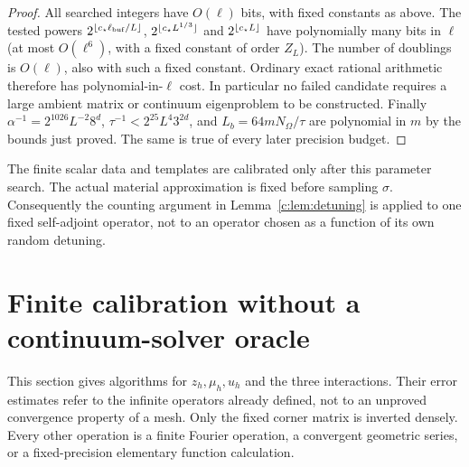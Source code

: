 \begin{proof}
All searched integers have $O(\ell)$ bits, with fixed constants as
above. The tested powers $2^{\lfloor c_\star \ell_{\rm buf}/L\rfloor}$,
$2^{\lfloor c_\star L^{1/3}\rfloor}$ and $2^{\lfloor c_\star L\rfloor}$ have
polynomially many bits in $\ell$ (at most $O(\ell^6)$, with a fixed
constant of order $Z_L$). The number of doublings is $O(\ell)$, also with such a
fixed constant. Ordinary exact rational arithmetic therefore has
polynomial-in-$\ell$ cost. In particular no failed candidate requires
a large ambient matrix or continuum eigenproblem to be constructed.
Finally $\alpha^{-1}=2^{1026}L^{-2}8^d$,
$\tau^{-1}<2^{25}L^4 3^{2d}$, and
$L_b=64mN_\Omega/\tau$ are polynomial in $m$ by the bounds just proved.
The same is true of every later precision budget.
\end{proof}

The finite scalar data and templates are calibrated only after this
parameter search. The actual material approximation is fixed before
sampling $\sigma$. Consequently the counting argument in
Lemma~\ref{c:lem:detuning} is applied to one fixed self-adjoint operator,
not to an operator chosen as a function of its own random detuning.

\section{Finite calibration without a continuum-solver oracle}
\label{c:sec:calibration}

This section gives algorithms for $z_h,\mu_h,u_h$ and the three
interactions. Their error estimates refer to the infinite operators
already defined, not to an unproved convergence property of a mesh.
Only the fixed corner matrix is inverted densely. Every other operation
is a finite Fourier operation, a convergent geometric series, or a
fixed-precision elementary function calculation.

